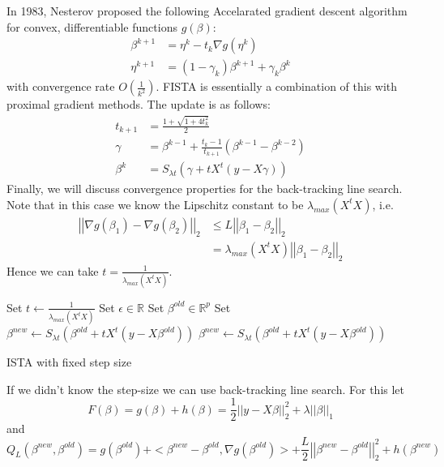 \documentclass[12pt, leqno]{article}
\newcommand{\norm}[1]{\left|\left|#1\right|\right|}
\theoremstyle{remark}
\begin{document}
In 1983, Nesterov proposed the following Accelarated gradient descent algorithm for convex, differentiable functions $g(\beta)$:
\begin{align*}
\beta^{k+1} &= \eta^{k} - t_k \nabla g(\eta^k)\\
\eta^{k+1} &= (1- \gamma_k) \beta^{k+1} + \gamma_k \beta^{k}
\end{align*}
with convergence rate $O(\frac{1}{k^2})$. 
FISTA is essentially a combination of this with proximal gradient methods. The update is as follows:
\begin{align*}
t_{k+1} &= \frac{1 + \sqrt{1+4t_k^2}}{2} \\
\gamma &= \beta^{k-1} + \frac{t_k-1}{t_{k+1}} (\beta^{k-1} - \beta^{k-2}) \\
\beta^{k} &= S_{\lambda t} (\gamma + t X^t (y -
X \gamma)) 
\end{align*}
Finally, we will discuss convergence properties for the back-tracking
line search. Note that in this case we know the Lipschitz constant to be $\lambda_{max} (X^t X)$, i.e. 
\begin{align*}
\norm{\nabla g(\beta_1) - \nabla g(\beta_2)}_2 & \leq L \norm{\beta_1 - \beta_2}_2 \\
&= \lambda_{max}(X^t X) \norm{\beta_1 - \beta_2}_2
\end{align*}
Hence we can take $t = \frac{1}{\lambda_{max}(X^t X)}$.

\begin{algorithm}[H]
\begin{algorithmic}
\State Set $t \gets \frac{1}{\lambda_{max}(X^t X)}$
\State Set $\epsilon \in \mathbb{R}$
\State Set $\beta^{old} \in \mathbb{R}^p$
\State Set $\beta^{new} \gets S_{\lambda t} (\beta^{old} + t X^t (y -
X \beta^{old}))$
\While {$\norm{\beta^{new} - \beta^{old}}_{\infty} \geq \epsilon$}
   \State $\beta^{new} \gets S_{\lambda t} (\beta^{old} + t X^t (y -
X \beta^{old}))$
    \EndWhile
\end{algorithmic}
\caption{ISTA with fixed step size}
\end{algorithm}

If we didn't know the step-size we can use back-tracking line search. For this let $$F(\beta) = g(\beta) + h(\beta) = \frac{1}{2}\norm{y- X \beta}_2^2 + \lambda \norm{\beta}_1$$
and 
$$
Q_L(\beta^{new},\beta^{old}) = g(\beta^{old}) + <\beta^{new} - \beta^{old}, \nabla g (\beta^{old})> + \frac{L}{2} \norm{\beta^{new}-\beta^{old}}_2^2 + h(\beta^{new})
$$
\end{document}
